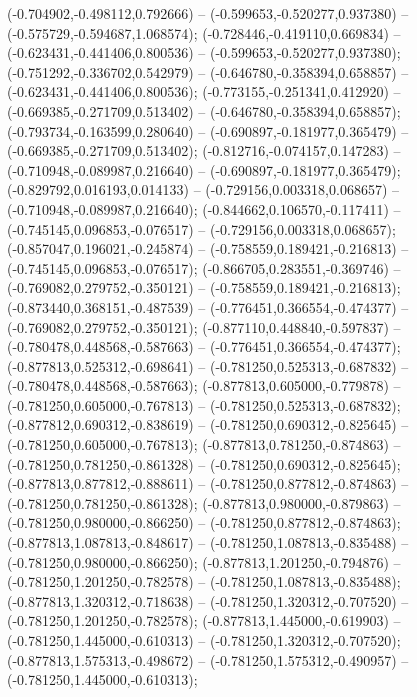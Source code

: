  (-0.704902,-0.498112,0.792666) -- (-0.599653,-0.520277,0.937380) -- (-0.575729,-0.594687,1.068574);
 (-0.728446,-0.419110,0.669834) -- (-0.623431,-0.441406,0.800536) -- (-0.599653,-0.520277,0.937380);
 (-0.751292,-0.336702,0.542979) -- (-0.646780,-0.358394,0.658857) -- (-0.623431,-0.441406,0.800536);
 (-0.773155,-0.251341,0.412920) -- (-0.669385,-0.271709,0.513402) -- (-0.646780,-0.358394,0.658857);
 (-0.793734,-0.163599,0.280640) -- (-0.690897,-0.181977,0.365479) -- (-0.669385,-0.271709,0.513402);
 (-0.812716,-0.074157,0.147283) -- (-0.710948,-0.089987,0.216640) -- (-0.690897,-0.181977,0.365479);
 (-0.829792,0.016193,0.014133) -- (-0.729156,0.003318,0.068657) -- (-0.710948,-0.089987,0.216640);
 (-0.844662,0.106570,-0.117411) -- (-0.745145,0.096853,-0.076517) -- (-0.729156,0.003318,0.068657);
 (-0.857047,0.196021,-0.245874) -- (-0.758559,0.189421,-0.216813) -- (-0.745145,0.096853,-0.076517);
 (-0.866705,0.283551,-0.369746) -- (-0.769082,0.279752,-0.350121) -- (-0.758559,0.189421,-0.216813);
 (-0.873440,0.368151,-0.487539) -- (-0.776451,0.366554,-0.474377) -- (-0.769082,0.279752,-0.350121);
 (-0.877110,0.448840,-0.597837) -- (-0.780478,0.448568,-0.587663) -- (-0.776451,0.366554,-0.474377);
 (-0.877813,0.525312,-0.698641) -- (-0.781250,0.525313,-0.687832) -- (-0.780478,0.448568,-0.587663);
 (-0.877813,0.605000,-0.779878) -- (-0.781250,0.605000,-0.767813) -- (-0.781250,0.525313,-0.687832);
 (-0.877812,0.690312,-0.838619) -- (-0.781250,0.690312,-0.825645) -- (-0.781250,0.605000,-0.767813);
 (-0.877813,0.781250,-0.874863) -- (-0.781250,0.781250,-0.861328) -- (-0.781250,0.690312,-0.825645);
 (-0.877813,0.877812,-0.888611) -- (-0.781250,0.877812,-0.874863) -- (-0.781250,0.781250,-0.861328);
 (-0.877813,0.980000,-0.879863) -- (-0.781250,0.980000,-0.866250) -- (-0.781250,0.877812,-0.874863);
 (-0.877813,1.087813,-0.848617) -- (-0.781250,1.087813,-0.835488) -- (-0.781250,0.980000,-0.866250);
 (-0.877813,1.201250,-0.794876) -- (-0.781250,1.201250,-0.782578) -- (-0.781250,1.087813,-0.835488);
 (-0.877813,1.320312,-0.718638) -- (-0.781250,1.320312,-0.707520) -- (-0.781250,1.201250,-0.782578);
 (-0.877813,1.445000,-0.619903) -- (-0.781250,1.445000,-0.610313) -- (-0.781250,1.320312,-0.707520);
 (-0.877813,1.575313,-0.498672) -- (-0.781250,1.575312,-0.490957) -- (-0.781250,1.445000,-0.610313);
